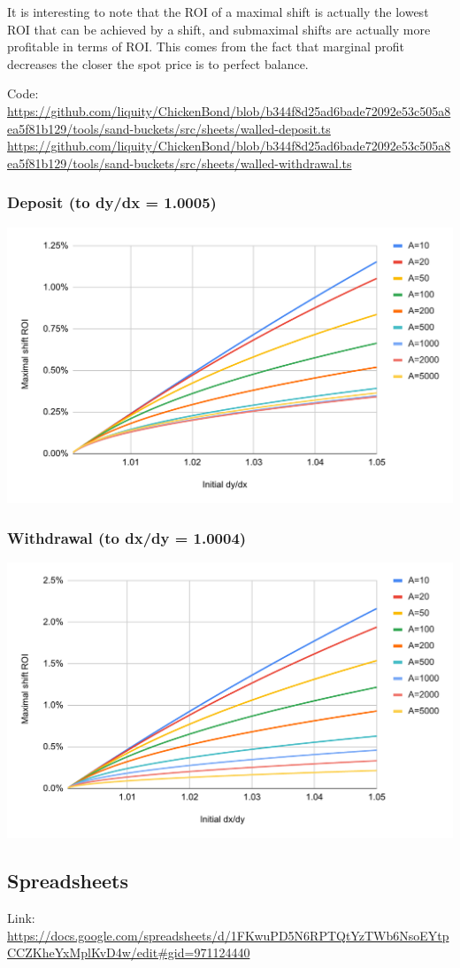 \documentclass{article}
\begin{document}
It is interesting to note that the ROI of a maximal shift is actually the lowest ROI that can be achieved by a shift, and submaximal shifts are actually more profitable in terms of ROI. This comes from the fact that marginal profit decreases the closer the spot price is to perfect balance.

Code:
\url{https://github.com/liquity/ChickenBond/blob/b344f8d25ad6bade72092e53c505a8ea5f81b129/tools/sand-buckets/src/sheets/walled-deposit.ts}
\url{https://github.com/liquity/ChickenBond/blob/b344f8d25ad6bade72092e53c505a8ea5f81b129/tools/sand-buckets/src/sheets/walled-withdrawal.ts}

\subsubsection{Deposit (to dy/dx = 1.0005)}

\includegraphics[width=\linewidth]{./LUSDChickenBonds_Shifting_Profitability_5.png}

\subsubsection{Withdrawal (to dx/dy = 1.0004)}

\includegraphics[width=\linewidth]{./LUSDChickenBonds_Shifting_Profitability_6.png}

\subsection{Spreadsheets}

Link:
\url{https://docs.google.com/spreadsheets/d/1FKwuPD5N6RPTQtYzTWb6NsoEYtpCCZKheYxMplKvD4w/edit#gid=971124440}
\end{document}
